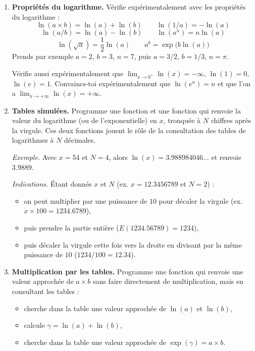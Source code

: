 \documentclass[11pt,class=report,crop=false]{standalone}
\begin{document}
\begin{activite}


  \begin{enumerate}
    \item \textbf{Propriétés du logarithme.}
    Vérifie expérimentalement avec \Python{} les propriétés du logarithme :
    $$\ln(a\times b) = \ln(a) + \ln(b) \qquad \ln(1/a) = - \ln(a)$$
    $$\ln(a / b) = \ln(a) - \ln(b) \qquad \ln(a^n) = n\ln(a)$$
    $$\ln(\sqrt{a}) = \frac12 \ln(a)  \qquad a^b = \exp\big(b \ln(a)\big)$$
    Prends par exemple $a = 2$, $b = 3$, $n = 7$, puis $a = 3/2$, $b = 1/3$, $n = \pi$.
    
    Vérifie aussi expérimentalement que $\lim_{x\to 0^+} \ln(x) = -\infty$,
    $\ln(1)=0$, $\ln(e)=1$. Convaincs-toi expérimentalement que $\ln(e^n) = n$ et que l'on a $\lim_{x\to +\infty} \ln(x) = +\infty$.
    
    \item \textbf{Tables simulées.} 
    Programme une fonction  et une fonction 
    qui renvoie la valeur du logarithme (ou de l'exponentielle) en $x$, tronquée à $N$ chiffres après la virgule. Ces deux fonctions jouent le rôle de la consultation des tables de logarithmes à $N$ décimales.
   
    
    \emph{Exemple.} Avec $x=54$ et $N=4$, alors $\ln(x) = 3.988984046\ldots$ et  renvoie $3.9889$.
    
    \emph{Indications.} \'Etant donnés $x$ et $N$ (ex. $x=12.3456789$ et $N=2$) :
	\begin{itemize}  
	  \item on peut multiplier par une puissance de $10$ pour décaler la virgule (ex. $x \times 100 = 1234.6789$),
	  \item puis prendre la partie entière ($E(1234.56789) = 1234$),
	  \item puis décaler la virgule cette fois vers la droite en divisant par la même puissance de $10$ ($1234/100 = 12.34$).
	\end{itemize}
	
	
	
	\item \textbf{Multiplication par les tables.}
	Programme une fonction  qui renvoie une valeur approchée de $a\times b$ sans faire directement de multiplication, mais en consultant les tables :
	\begin{itemize}
	  \item cherche dans la table une valeur approchée de $\ln(a)$ et $\ln(b)$,
	  \item calcule $\gamma = \ln(a)+\ln(b)$,
	  \item cherche dans la table une valeur approchée de $\exp(\gamma) = a \times b$.
	\end{itemize}


\end{enumerate}
\end{activite}
\end{document}
